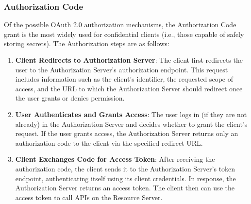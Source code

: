 %
%
%

\subsubsection{Authorization Code}
\label{cha:relatedwork:OAuth:authcode}

Of the possible OAuth 2.0 authorization mechanisms,
the Authorization Code grant is the most widely used for confidential clients (i.e., those capable of safely storing secrets).
The Authorization steps are as follows:

\begin{enumerate}

  \item \textbf{Client Redirects to Authorization Server}:
    The client first redirects the user to the Authorization Server’s authorization endpoint.
    This request includes information such as the client’s identifier, the requested scope of access,
    and the URL to which the Authorization Server should redirect once the user grants or denies permission.

  \item \textbf{User Authenticates and Grants Access}:
    The user logs in (if they are not already) in the Authorization Server and decides whether to grant the client’s request.
    If the user grants access, the Authorization Server returns only an authorization code to the client via the specified redirect URL.

  \item \textbf{Client Exchanges Code for Access Token}:
    After receiving the authorization code, the client sends it to the Authorization Server’s token endpoint,
    authenticating itself using its client credentials.
    In response, the Authorization Server returns an access token.
    The client then can use the access token to call APIs on the Resource Server.
\end{enumerate}

